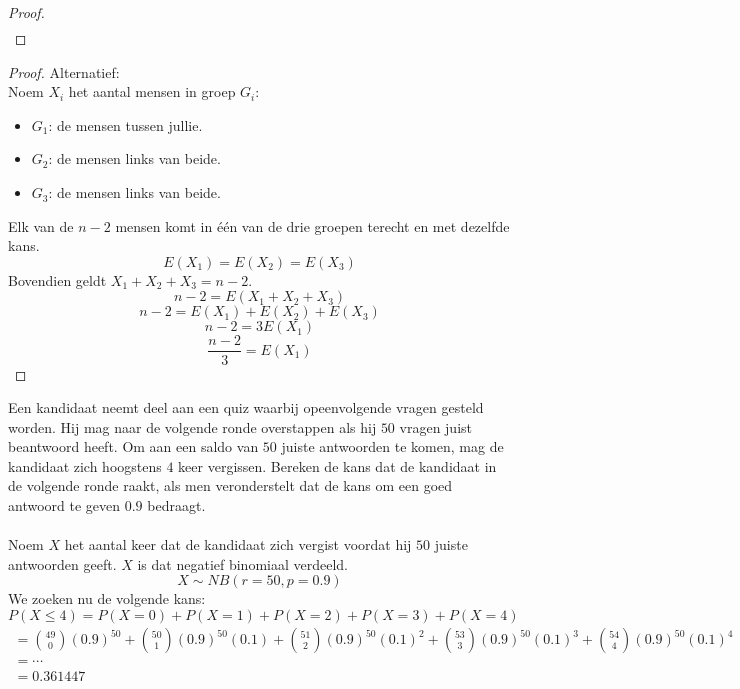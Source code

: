 \documentclass[main.tex]{subfiles}
\begin{document}
\begin{oef}
\begin{proof}
\[\begin{array}{rl}
    \end{array}
    \]
\end{proof}
\begin{proof}
  Alternatief:\\
  Noem $X_{i}$ het aantal mensen in groep $G_{i}$:
  \begin{itemize}
  \item $G_{1}$: de mensen tussen jullie.
  \item $G_{2}$: de mensen links van beide.
  \item $G_{3}$: de mensen links van beide.
  \end{itemize}
  Elk van de $n-2$ mensen komt in \'e\'en van de drie groepen terecht en met dezelfde kans.
  \[ E(X_{1}) = E(X_{2}) = E(X_{3}) \]
  Bovendien geldt $X_{1}+X_{2}+X_{3}= n-2$.
  \[ n-2 = E(X_{1}+X_{2}+X_{3}) \]
  \[ n-2 = E(X_{1})+E(X_{2})+E(X_{3}) \]
  \[ n-2 = 3E(X_{1}) \]
  \[ \frac{n-2}{3} = E(X_{1}) \]
\end{proof}
\end{oef}

\begin{oef}
  Een kandidaat neemt deel aan een quiz waarbij opeenvolgende vragen gesteld worden. Hij mag
naar de volgende ronde overstappen als hij $50$ vragen juist beantwoord heeft. Om aan een saldo
van $50$ juiste antwoorden te komen, mag de kandidaat zich hoogstens $4$ keer vergissen. Bereken
de kans dat de kandidaat in de volgende ronde raakt, als men veronderstelt dat de kans om een
goed antwoord te geven $0.9$ bedraagt.\\\\
  Noem $X$ het aantal keer dat de kandidaat zich vergist voordat hij $50$ juiste antwoorden geeft.
  $X$ is dat negatief binomiaal verdeeld.
  \[ X \sim NB(r=50,p=0.9) \]
  We zoeken nu de volgende kans:
  \[ P(X \le 4) = P(X=0) + P(X=1) + P(X=2) + P(X=3) + P(X=4) \]
  \[
  \begin{array}{l}
    = \binom{49}{0}(0.9)^{50} + \binom{50}{1}(0.9)^{50}(0.1) + \binom{51}{2}(0.9)^{50}(0.1)^{2} + \binom{53}{3}(0.9)^{50}(0.1)^{3} + \binom{54}{4}(0.9)^{50}(0.1)^{4}\\
    = \cdots\\
    = 0.361447
  \end{array}
  \]
\end{oef}
\end{document}
